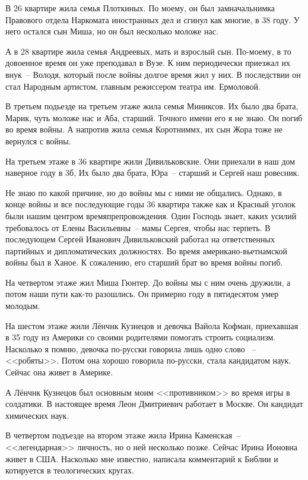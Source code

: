 В 26 квартире жила семья Плоткиных. По моему,  он был замначальнимка Правового отдела Наркомата иностранных дел и сгинул как многие, в 38 году. У него остался сын Миша, но он был несколько моложе нас.

А в 28 квартире жила семья Андреевых, мать и взрослый сын. По-моему, в то довоенное время он уже преподавал в Вузе. К ним периодически приезжал их внук~-- Володя, который после войны долгое время жил у них. В последствии он стал Народным артистом, главным режиссером театра им. Ермоловой.

В третьем подьезде на третьем этаже жила семья Миниксов. Их было два брата, Марик, чуть моложе нас и Аба, старший. Точного имени его я не знаю. Он погиб во время войны. А напротив жила семья Коротниммх, их сын Жора тоже не вернулся с войны.

На третьем этаже в 36 квартире жили Дивильковские. Они приехали в наш дом наверное году в 3б, Их было два брата, Юра~-- старший и Сергей наш ровесник.

Не знаю по какой причине, но до войны мы с ними не общались. Однако, в конце войны и все последующие годы 36 квартира также как и Красный уголок были нашим центром времяпрепровождения. Один Господь знает, каких усилий требовалось от Елены Васильевны~-- мамы Сергея, чтобы нас терпеть. В последующем Сергей Иванович Дивильковский работал на ответственных партийных и дипломатических должностях. Во время американо-вьетнамской войны был в Ханое. К сожалению, его старший брат во время войны погиб.

На четвертом этаже жил Миша Гюнтер. До войны мы с ним очень дружили, а потом наши пути как-то разошлись. Он примерно году в пятидесятом умер молодым.

На шестом этаже жили Лёнчнк Кузнецов и девочка Вайола Кофман, приехавшая в 35 году из Америки со своими родителями помогать строить социализм. Насколько я помню, девочка по-русски говорила лишь одно слово ~-- <<робяты>>. Потом она хорошо говорила по-русски, стала кандидатом наук. Сейчас она живет в Америке.

А Лёнчнк Кузнецов был основным моим <<противником>> во время игры в солдатики. В настоящее время Леон Дмитриевич работает в Москве. Он кандидат химических наук.

В четвертом подъезде на втором этаже жила Ирина Каменская~-- <<легендарная>> личность, но о ней несколько позже. Сейчас Ирина Ионовна живет в США. Насколько мне известно, написала комментарий к Библии и котируется в теологических кругах.

